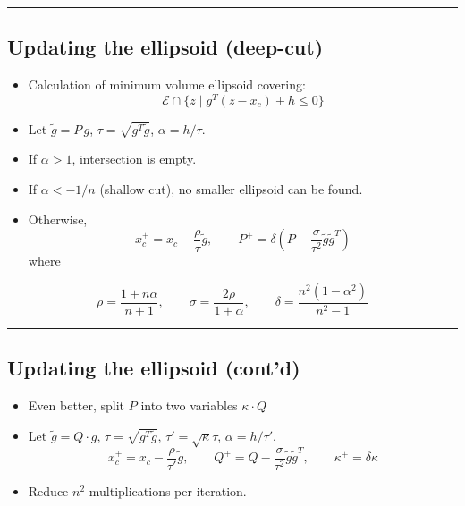 \documentclass[]{article}
\providecommand{\tightlist}{%
  \setlength{\itemsep}{0pt}\setlength{\parskip}{0pt}}
\begin{document}
\begin{center}\rule{0.5\linewidth}{\linethickness}\end{center}

\hypertarget{updating-the-ellipsoid-deep-cut}{%
\subsection{Updating the ellipsoid
(deep-cut)}\label{updating-the-ellipsoid-deep-cut}}

\begin{itemize}
\tightlist
\item
  Calculation of minimum volume ellipsoid covering:
  \[\mathcal{E} \cap \{z \mid g^T (z - x_c) + h \leq 0 \}\]
\item
  Let \(\tilde{g} = P\,g\), \(\tau = \sqrt{g^T\tilde{g}}\),
  \(\alpha = h/\tau\).
\item
  If \(\alpha > 1\), intersection is empty.
\item
  If \(\alpha < -1/n\) (shallow cut), no smaller ellipsoid can be found.
\item
  Otherwise, \[x_c^+ = x_c - \frac{\rho}{\tau} \tilde{g}, \qquad
  P^+ = \delta\left(P - \frac{\sigma}{\tau^2} \tilde{g}\tilde{g}^T\right)
   \] where
\end{itemize}

\[\rho = \frac{1+n\alpha}{n+1}, \qquad
  \sigma = \frac{2\rho}{1+\alpha}, \qquad
  \delta = \frac{n^2(1-\alpha^2)}{n^2 - 1} \]

\begin{center}\rule{0.5\linewidth}{\linethickness}\end{center}

\hypertarget{updating-the-ellipsoid-contd}{%
\subsection{Updating the ellipsoid
(cont'd)}\label{updating-the-ellipsoid-contd}}

\begin{itemize}
\tightlist
\item
  Even better, split \(P\) into two variables \(\kappa \cdot Q\)
\item
  Let \(\tilde{g} = Q \cdot g\), \(\tau = \sqrt{g^T\tilde{g}}\),
  \(\tau' = \sqrt{\kappa} \tau\), \(\alpha = h/\tau'\).
  \[x_c^+ = x_c - \frac{\rho}{\tau'} \tilde{g}, \qquad
  Q^+ = Q - \frac{\sigma}{\tau^2} \tilde{g}\tilde{g}^T, \qquad
  \kappa^+ =  \delta \kappa
   \]
\item
  Reduce \(n^2\) multiplications per iteration.
\end{itemize}
\end{document}
